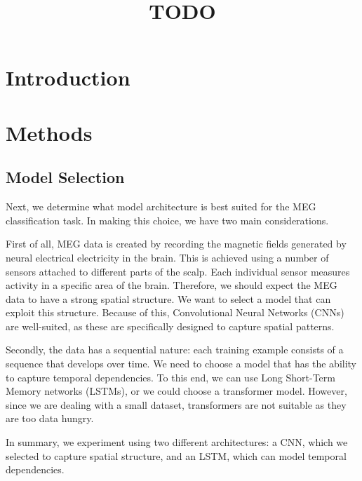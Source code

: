 \documentclass[conference]{IEEEtran}
\begin{document}
\title{TODO}

\author{
}

\maketitle

\begin{abstract}
\end{abstract}

\section{Introduction}


\section{Methods}

\subsection{Model Selection}

Next, we determine what model architecture is best suited for the MEG classification task.
 In making this choice, we have two main considerations.


 First of all, MEG data is created by recording the magnetic fields generated by neural electrical electricity in the brain.
 This is achieved using a number of sensors attached to different parts of the scalp. Each individual sensor measures activity
 in a specific area of the brain. Therefore, we should expect the MEG data to have a strong spatial structure. We want to select
 a model that can exploit this structure. Because of this, Convolutional Neural Networks (CNNs) are well-suited, as these are 
 specifically designed to capture spatial patterns. 


 Secondly, the data has a sequential nature: each training example consists of a sequence that develops over time. We need to choose a model 
 that has the ability to capture temporal dependencies. To this end, we can use Long Short-Term Memory networks (LSTMs), or we could choose a 
 transformer model. However, since we are dealing with a small dataset, transformers are not suitable as they are too data hungry.
 

 In summary, we experiment using two different architectures: a CNN, which we selected to capture spatial structure, and an LSTM, which can model 
 temporal dependencies.
\end{document}
